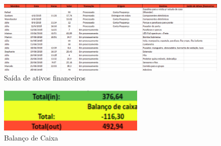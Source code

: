 \begin{figure}[H]
	\centering
	\includegraphics[width=17cm]{figuras/saida_ativos_junho.png}
	\caption{Saída de ativos financeiros} \label{saida_ativos_junho}
\end{figure}

\begin{figure}[H]
	\centering
	\includegraphics[width=7cm]{figuras/balanco_junho.png}
	\caption{Balanço de Caixa} \label{balanco_junho}
\end{figure}